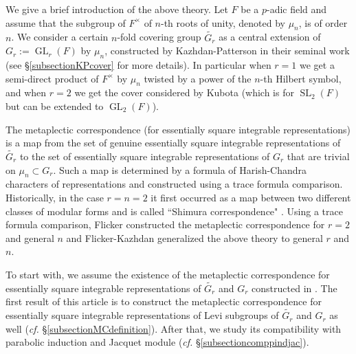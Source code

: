 \documentclass{amsart}
\numberwithin{equation}{section}
\newcommand{\mrgl}{\operatorname{GL}}
\newcommand{\mrsl}{\operatorname{SL}}
\newcommand{\wt}[1]{\widetilde{#1}}
\begin{document}
	We give a brief introduction of the above theory. Let $F$ be a $p$-adic field and assume that the subgroup of $F^{\times}$ of $n$-th roots of unity, denoted by $\mu_{n}$, is of order $n$. We consider a certain $n$-fold covering group $\wt{G_{r}}$ as a central extension of $G_{r}:=\mrgl_{r}(F)$ by $\mu_{n}$, constructed by Kazhdan-Patterson in their seminal work \cite{kazhdan1984metaplectic} (see \S \ref{subsectionKPcover} for more details). In particular when $r=1$ we get a semi-direct product of $F^{\times}$ by $\mu_{n}$ twisted by a power of the $n$-th Hilbert symbol, and when $r=2$ we get the cover considered by Kubota \cite{kubota1967topological} (which is for $\mrsl_{2}(F)$ but can be extended to $\mrgl_{2}(F)$). 
	
	The metaplectic correspondence (for essentially square integrable representations) is a map from 
	the set of genuine essentially square integrable representations of $\wt{G_{r}}$ to the set of essentially square integrable representations of $G_{r}$ that are trivial on $\mu_{n}\subset G_r$. Such a map is determined by a formula of Harish-Chandra characters of representations and constructed using a trace formula comparison. Historically, in the case $r=n=2$ it first occurred as a map between two different classes of modular forms and is called ``Shimura correspondence" \cite{shimura1973modular}. Using a trace formula comparison, Flicker \cite{flicker1980automorphic} constructed the metaplectic correspondence for $r=2$ and general $n$ and Flicker-Kazhdan \cite{flicker1986metaplectic} generalized the above theory to general $r$ and $n$. 
	
	To start with, we assume the existence of the metaplectic correspondence for essentially square integrable representations of $\wt{G_r}$ and $G_r$ constructed in \cite{flicker1986metaplectic}. The first result of this article is to construct the metaplectic correspondence for essentially square integrable representations of Levi subgroups of $\wt{G_r}$ and $G_r$ as well (\emph{cf.} \S \ref{subsectionMCdefinition}). After that, we study its compatibility with parabolic induction and Jacquet module (\emph{cf.} \S \ref{subsectioncomppindjac}).
	
\end{document}
